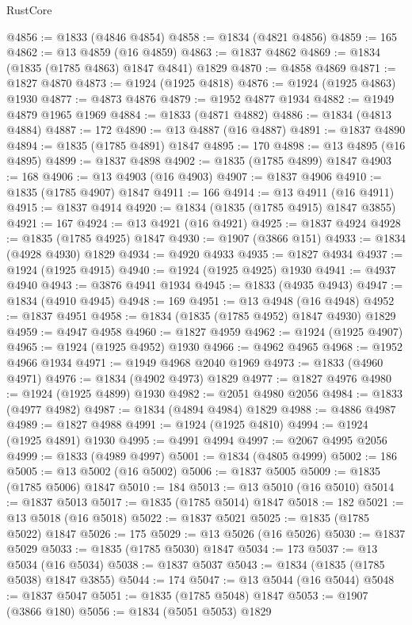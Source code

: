 \begin{lexlean}{RustCore}
\begin{coremodule}
@4856 := @1833 (@4846 @4854)
@4858 := @1834 (@4821 @4856)
@4859 := 165
@4862 := @13 @4859 (@16 @4859)
@4863 := @1837 @4862
@4869 := @1834 (@1835 (@1785 @4863) @1847 @4841) @1829
@4870 := @4858 @4869
@4871 := @1827 @4870
@4873 := @1924 (@1925 @4818)
@4876 := @1924 (@1925 @4863) @1930
@4877 := @4873 @4876
@4879 := @1952 @4877 @1934
@4882 := @1949 @4879 @1965 @1969
@4884 := @1833 (@4871 @4882)
@4886 := @1834 (@4813 @4884)
@4887 := 172
@4890 := @13 @4887 (@16 @4887)
@4891 := @1837 @4890
@4894 := @1835 (@1785 @4891) @1847
@4895 := 170
@4898 := @13 @4895 (@16 @4895)
@4899 := @1837 @4898
@4902 := @1835 (@1785 @4899) @1847
@4903 := 168
@4906 := @13 @4903 (@16 @4903)
@4907 := @1837 @4906
@4910 := @1835 (@1785 @4907) @1847
@4911 := 166
@4914 := @13 @4911 (@16 @4911)
@4915 := @1837 @4914
@4920 := @1834 (@1835 (@1785 @4915) @1847 @3855)
@4921 := 167
@4924 := @13 @4921 (@16 @4921)
@4925 := @1837 @4924
@4928 := @1835 (@1785 @4925) @1847
@4930 := @1907 (@3866 @151)
@4933 := @1834 (@4928 @4930) @1829
@4934 := @4920 @4933
@4935 := @1827 @4934
@4937 := @1924 (@1925 @4915)
@4940 := @1924 (@1925 @4925) @1930
@4941 := @4937 @4940
@4943 := @3876 @4941 @1934
@4945 := @1833 (@4935 @4943)
@4947 := @1834 (@4910 @4945)
@4948 := 169
@4951 := @13 @4948 (@16 @4948)
@4952 := @1837 @4951
@4958 := @1834 (@1835 (@1785 @4952) @1847 @4930) @1829
@4959 := @4947 @4958
@4960 := @1827 @4959
@4962 := @1924 (@1925 @4907)
@4965 := @1924 (@1925 @4952) @1930
@4966 := @4962 @4965
@4968 := @1952 @4966 @1934
@4971 := @1949 @4968 @2040 @1969
@4973 := @1833 (@4960 @4971)
@4976 := @1834 (@4902 @4973) @1829
@4977 := @1827 @4976
@4980 := @1924 (@1925 @4899) @1930
@4982 := @2051 @4980 @2056
@4984 := @1833 (@4977 @4982)
@4987 := @1834 (@4894 @4984) @1829
@4988 := @4886 @4987
@4989 := @1827 @4988
@4991 := @1924 (@1925 @4810)
@4994 := @1924 (@1925 @4891) @1930
@4995 := @4991 @4994
@4997 := @2067 @4995 @2056
@4999 := @1833 (@4989 @4997)
@5001 := @1834 (@4805 @4999)
@5002 := 186
@5005 := @13 @5002 (@16 @5002)
@5006 := @1837 @5005
@5009 := @1835 (@1785 @5006) @1847
@5010 := 184
@5013 := @13 @5010 (@16 @5010)
@5014 := @1837 @5013
@5017 := @1835 (@1785 @5014) @1847
@5018 := 182
@5021 := @13 @5018 (@16 @5018)
@5022 := @1837 @5021
@5025 := @1835 (@1785 @5022) @1847
@5026 := 175
@5029 := @13 @5026 (@16 @5026)
@5030 := @1837 @5029
@5033 := @1835 (@1785 @5030) @1847
@5034 := 173
@5037 := @13 @5034 (@16 @5034)
@5038 := @1837 @5037
@5043 := @1834 (@1835 (@1785 @5038) @1847 @3855)
@5044 := 174
@5047 := @13 @5044 (@16 @5044)
@5048 := @1837 @5047
@5051 := @1835 (@1785 @5048) @1847
@5053 := @1907 (@3866 @180)
@5056 := @1834 (@5051 @5053) @1829

\end{coremodule}
\end{lexlean}
